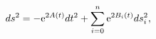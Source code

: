 \begin{equation}\label{metric1}
ds^2 = - {\rm e}^{2A(t)} dt^2 + \sum_{i=0}^n {\rm e}^{2B_i(t)}
ds^2_i,
\end{equation}

